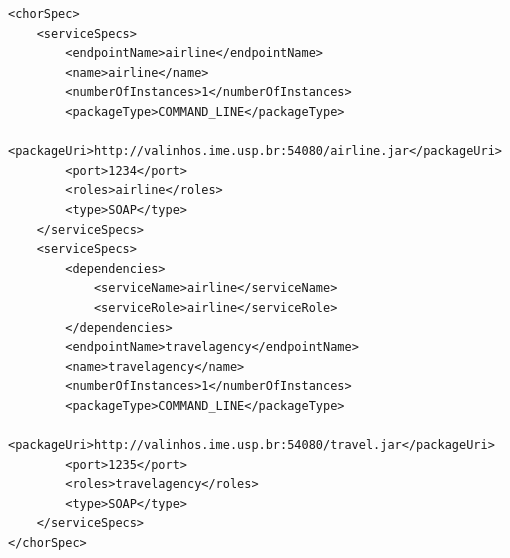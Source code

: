 \documentclass[a4paper, 10pt]{article}
\begin{document}
{\footnotesize

\lstset{language=XML}

\begin{lstlisting}[caption=ChorSpec XML representation example, label=lst:chor_spec_xml]
<chorSpec>
    <serviceSpecs>
        <endpointName>airline</endpointName>
        <name>airline</name>
        <numberOfInstances>1</numberOfInstances>
        <packageType>COMMAND_LINE</packageType>
        <packageUri>http://valinhos.ime.usp.br:54080/airline.jar</packageUri>
        <port>1234</port>
        <roles>airline</roles>
        <type>SOAP</type>
    </serviceSpecs>
    <serviceSpecs>
        <dependencies>
            <serviceName>airline</serviceName>
            <serviceRole>airline</serviceRole>
        </dependencies>
        <endpointName>travelagency</endpointName>
        <name>travelagency</name>
        <numberOfInstances>1</numberOfInstances>
        <packageType>COMMAND_LINE</packageType>
        <packageUri>http://valinhos.ime.usp.br:54080/travel.jar</packageUri>
        <port>1235</port>
        <roles>travelagency</roles>
        <type>SOAP</type>
    </serviceSpecs>
</chorSpec>\end{lstlisting}

}
\end{document}
